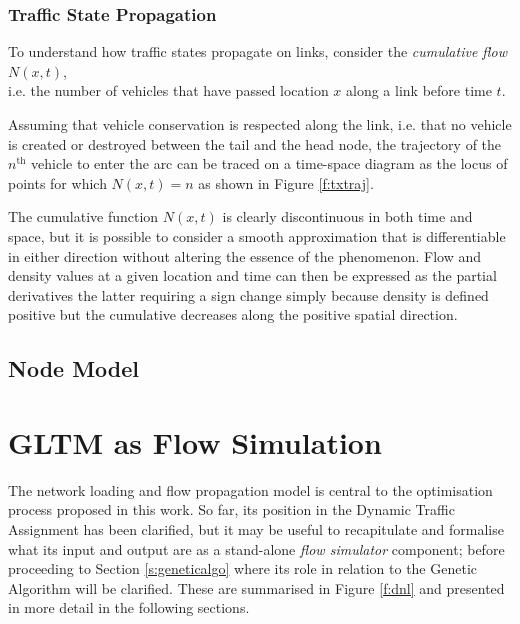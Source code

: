 \subsubsection{Traffic State Propagation}
To understand how traffic states propagate on links, consider the \emph{cumulative flow} $N(x,t)$, \\ i.e. the number of vehicles that have passed location $x$ along a link before time $t$.

Assuming that vehicle conservation is respected along the link, i.e. that no vehicle is created or destroyed between the tail and the head node, the trajectory of the $n^{\mathrm{th}}$ vehicle to enter the arc can be traced on a time-space diagram as the locus of points for which $N(x,t) = n$ as shown in Figure \ref{f:txtraj}.


The cumulative function $N(x,t)$ is clearly discontinuous in both time and space, but it is possible to consider a smooth approximation that is differentiable in either direction without altering the essence of the phenomenon. Flow and density values at a given location and time can then be expressed as the partial derivatives
the latter requiring a sign change simply because density is defined positive but the cumulative decreases along the positive spatial direction.




\subsection{Node Model} \label{s:nodemodel}

\section{GLTM as Flow Simulation}
The network loading and flow propagation model is central to the optimisation process proposed in this work.
So far, its position in the Dynamic Traffic Assignment has been clarified, but it may be useful to recapitulate and formalise what its input and output are as a stand-alone \emph{flow simulator} component; before proceeding to Section \ref{s:geneticalgo} where its role in relation to the Genetic Algorithm will be clarified. These are summarised in Figure \ref{f:dnl} and presented in more detail in the following sections.

